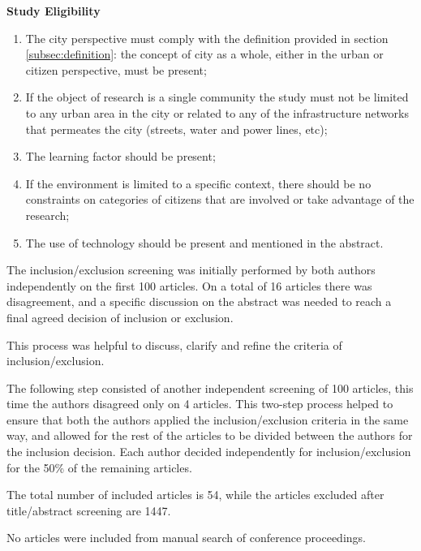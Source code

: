 \textbf{Study Eligibility}
\begin{enumerate}
\item The city perspective must comply with the definition provided in section \ref{subsec:definition}: the concept of city as a whole, either in the urban or citizen perspective, must be present;
\item If the object of research is a single community the study must not be limited to any urban area in the city or related to any of the infrastructure networks that permeates the city (streets, water and power lines, etc);
\item The learning factor should be present;
\item If the environment is limited to a specific context, there should be no constraints on categories of citizens that are involved or take advantage of the research;
\item The use of technology should be present and mentioned in the abstract.
\end{enumerate}

The inclusion/exclusion screening was initially performed by both authors independently on the first 100 articles. On a total of 16 articles there was disagreement, and a specific discussion on the abstract was needed to reach a final agreed decision of inclusion or exclusion.

This process was helpful to discuss, clarify and refine the criteria of inclusion/exclusion.

The following step consisted of another independent screening of 100 articles, this time the authors disagreed only on 4 articles. This two-step process helped to ensure that both the authors applied the inclusion/exclusion criteria in the same way, and allowed for the rest of the articles to be divided between the authors for the inclusion decision. Each author decided independently for inclusion/exclusion for the 50\% of the remaining articles.

The total number of included articles is 54, while the articles excluded after title/abstract screening are 1447.

No articles were included from manual search of conference proceedings.